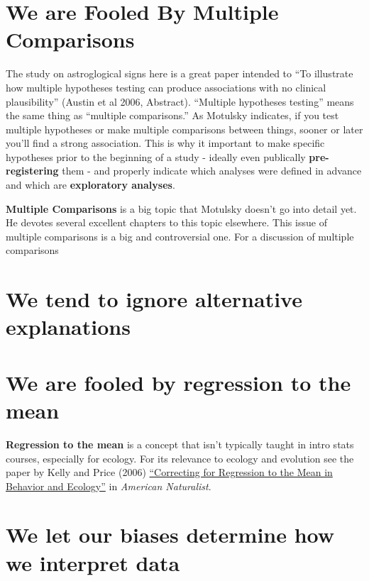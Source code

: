 \documentclass[]{book}
\theoremstyle{definition}
\theoremstyle{definition}
\theoremstyle{definition}
\theoremstyle{remark}
\begin{document}
\section{We are Fooled By Multiple
Comparisons}\label{we-are-fooled-by-multiple-comparisons}

The study on astroglogical signs here is a great paper intended to ``To
illustrate how multiple hypotheses testing can produce associations with
no clinical plausibility'' (Austin et al 2006, Abstract). ``Multiple
hypotheses testing'' means the same thing as ``multiple comparisons.''
As Motulsky indicates, if you test multiple hypotheses or make multiple
comparisons between things, sooner or later you'll find a strong
association. This is why it important to make specific hypotheses prior
to the beginning of a study - ideally even publically
\textbf{pre-registering} them - and properly indicate which analyses
were defined in advance and which are \textbf{exploratory analyses}.

\textbf{Multiple Comparisons} is a big topic that Motulsky doesn't go
into detail yet. He devotes several excellent chapters to this topic
elsewhere. This issue of multiple comparisons is a big and controversial
one. For a discussion of multiple comparisons

\section{We tend to ignore alternative
explanations}\label{we-tend-to-ignore-alternative-explanations}

\section{We are fooled by regression to the
mean}\label{we-are-fooled-by-regression-to-the-mean}

\textbf{Regression to the mean} is a concept that isn't typically taught
in intro stats courses, especially for ecology. For its relevance to
ecology and evolution see the paper by Kelly and Price (2006)
\href{https://www.journals.uchicago.edu/doi/abs/10.1086/497402}{``Correcting
for Regression to the Mean in Behavior and Ecology''} in \emph{American
Naturalist}.

\section{We let our biases determine how we interpret
data}\label{we-let-our-biases-determine-how-we-interpret-data}
\end{document}

